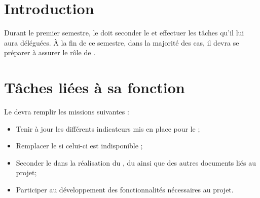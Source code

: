 \documentclass[11pt]{article}
\begin{document}

\section*{Introduction}

Durant le premier semestre, le \RQA{} doit seconder le \RQ{} et effectuer les tâches qu’il lui aura déléguées. À la fin de ce semestre, dans la majorité des cas, il devra se préparer à assurer le rôle de \RQ .

\section*{Tâches liées à sa fonction}

Le \RQA{} devra remplir les missions suivantes :
\begin{itemize}
	\item Tenir à jour les différents indicateurs mis en place pour le \PICCourt;
	\item Remplacer le \RQ{} si celui-ci est indisponible ;
	\item Seconder le \RQ{} dans la réalisation du \PQ, du \PGC{} ainsi que des autres documents liés au projet;
        \item Participer au développement des fonctionnalités nécessaires au projet. 
\end{itemize}
\end{document}
